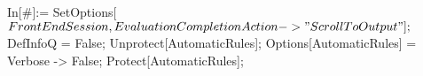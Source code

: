 In[\#]:= SetOptions[$FrontEndSession, EvaluationCompletionAction -> "ScrollToOutput"]; $DefInfoQ = False; Unprotect[AutomaticRules]; Options[AutomaticRules] = {Verbose -> False}; Protect[AutomaticRules]; 